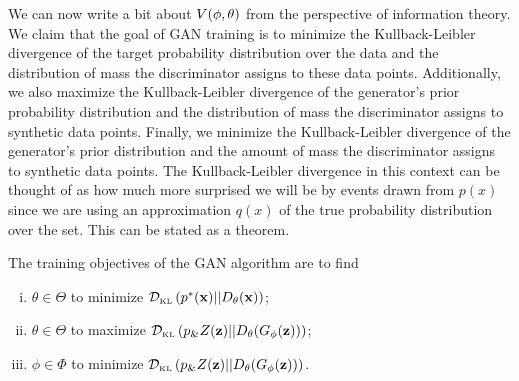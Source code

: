 We can now write a bit about $V(\phi, \theta)$ from the perspective of information
theory. We claim that the goal of GAN training is to minimize the
Kullback-Leibler divergence of the target probability distribution
over the data and the distribution of mass the discriminator assigns
to these data points.  Additionally, we also maximize the
Kullback-Leibler divergence of the generator's prior probability
distribution and the distribution of mass the discriminator assigns to
synthetic data points. Finally, we minimize the Kullback-Leibler
divergence of the generator's prior distribution and the amount of
mass the discriminator assigns to synthetic data points.  The
Kullback-Leibler divergence in this context can be thought of as how
much more surprised we will be by events drawn from $p(x)$ since we
are using an approximation $q(x)$ of the true probability distribution
over the set.  This can be stated as a theorem.

\begin{theorem}
  \label{theorem:mine-1}
  \label{contribution:one}
  The training objectives of the GAN algorithm are to find
  \begin{enumerate}[(i)]
  \item $\theta \in \Theta$ to minimize $\mathcal{D}_{\text{\tiny KL}}\left( p^*(\mathbf{x}) \middle| \middle| D_\theta(\mathbf{x}) \right)$;
  \item $\theta \in \Theta$ to maximize $\mathcal{D}_{\text{\tiny KL}}\left( p_\&Z(\mathbf{z}) \middle| \middle| D_\theta(G_\phi(\mathbf{z})) \right)$;
  \item $\phi \in \Phi$ to minimize $\mathcal{D}_{\text{\tiny KL}}\left( p_\&Z(\mathbf{z}) \middle| \middle| D_\theta(G_\phi(\mathbf{z})) \right)$.
  \end{enumerate}
\end{theorem}

